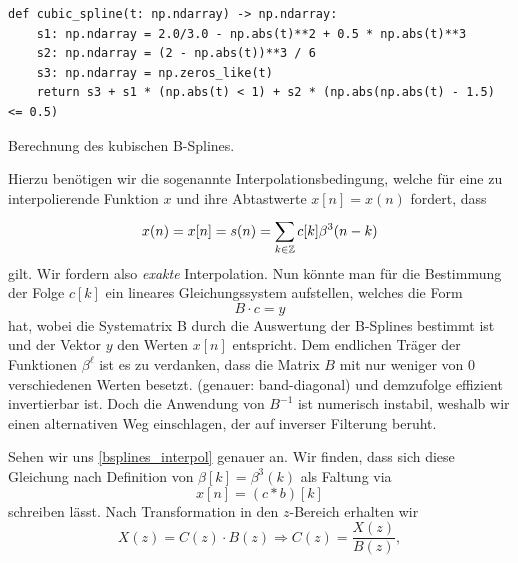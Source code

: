 \begin{listing}
\begin{verbatim}
def cubic_spline(t: np.ndarray) -> np.ndarray:
    s1: np.ndarray = 2.0/3.0 - np.abs(t)**2 + 0.5 * np.abs(t)**3
    s2: np.ndarray = (2 - np.abs(t))**3 / 6
    s3: np.ndarray = np.zeros_like(t)
    return s3 + s1 * (np.abs(t) < 1) + s2 * (np.abs(np.abs(t) - 1.5) <= 0.5)
\end{verbatim}
\caption{Berechnung des kubischen B-Splines.}\label{bsplines_eval}            
\end{listing}

Hierzu ben\"otigen wir die sogenannte Interpolationsbedingung, welche f\"ur eine zu interpolierende Funktion $x$ und ihre Abtastwerte $x[n] = x(n)$ fordert, dass
\begin{equation}\label{bsplines_interpol}
    x(n) = x[n] = s(n) = {\sum\limits_{k \in \mathbb{Z}}^{}{
        c[k] \beta^{3}(n - k)
    }}
\end{equation}
gilt. Wir fordern also \emph{exakte} Interpolation. Nun k\"onnte man f\"ur die Bestimmung der Folge $c[k]$ ein lineares Gleichungssystem aufstellen, welches die Form
%
\begin{equation}\label{bsplines_lse}
    B \cdot c = y
\end{equation}
%
hat, wobei die Systematrix B durch die Auswertung der B-Splines bestimmt ist und der Vektor $y$ den Werten $x[n]$ entspricht. Dem endlichen Tr\"ager der Funktionen $\beta^\ell$ ist es zu verdanken, dass die Matrix $B$ mit nur weniger von $0$ verschiedenen Werten besetzt. (genauer: band-diagonal) und demzufolge effizient invertierbar ist. Doch die Anwendung von $B^{-1}$ ist numerisch instabil, weshalb wir einen alternativen Weg einschlagen, der auf inverser Filterung beruht.

Sehen wir uns \eqref{bsplines_interpol} genauer an. Wir finden, dass sich diese Gleichung nach Definition von $\beta[k] = \beta^3(k)$ als Faltung via
\begin{equation}\label{bsplines_conv}
    x[n] = (c \ast b)[k]
\end{equation}
schreiben l\"asst. Nach Transformation in den $z$-Bereich erhalten wir
\begin{equation}\label{bsplines_ztrafo}
    X(z) = C(z) \cdot B(z) \Rightarrow C(z) = \frac{X(z)}{B(z)},
\end{equation}

